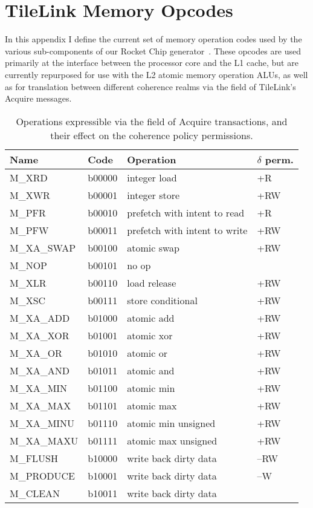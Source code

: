 \chapter{TileLink Memory Opcodes}
\label{a.memopcodes}

In this appendix I define the current set of memory operation codes used by
the various sub-components of our Rocket Chip generator~\cite{rocket}.
These opcodes are used primarily at the interface between the processor core and the L1 cache,
but are currently repurposed for use with the L2 atomic memory operation ALUs,
as well as for translation between different coherence realms via the  field
of TileLink's Acquire messages.

\begin{table}
\centering
\begin{tabular}{|l|l|l|l|}
\hline
Name  & Code & Operation & $\delta$ perm. \\ \hline \hline
M\_XRD      & b00000 & integer load & +R\\ \hline 
M\_XWR      & b00001 & integer store & +RW \\ \hline 
M\_PFR      & b00010 & prefetch with intent to read & +R \\ \hline 
M\_PFW      & b00011 & prefetch with intent to write & +RW \\ \hline 
M\_XA\_SWAP & b00100 & atomic swap & +RW \\ \hline 
M\_NOP      & b00101 & no op & \\ \hline 
M\_XLR      & b00110 & load release & +RW \\ \hline 
M\_XSC      & b00111 & store conditional & +RW \\ \hline 
M\_XA\_ADD  & b01000 & atomic add & +RW  \\ \hline 
M\_XA\_XOR  & b01001 & atomic xor & +RW  \\ \hline 
M\_XA\_OR   & b01010 & atomic or & +RW  \\ \hline 
M\_XA\_AND  & b01011 & atomic and & +RW  \\ \hline 
M\_XA\_MIN  & b01100 & atomic min & +RW  \\ \hline 
M\_XA\_MAX  & b01101 & atomic max & +RW  \\ \hline 
M\_XA\_MINU & b01110 & atomic min unsigned & +RW  \\ \hline 
M\_XA\_MAXU & b01111 & atomic max unsigned & +RW  \\ \hline 
M\_FLUSH    & b10000 & write back dirty data & --RW \\ \hline 
M\_PRODUCE  & b10001 & write back dirty data & --W \\ \hline 
M\_CLEAN    & b10011 & write back dirty data  & \\ \hline
\end{tabular}
\caption[The  field of Acquire transactions.]{
Operations expressible via the  field of Acquire transactions,
and their effect on the coherence policy permissions.}
\label{tab:opcodes}
\end{table}

